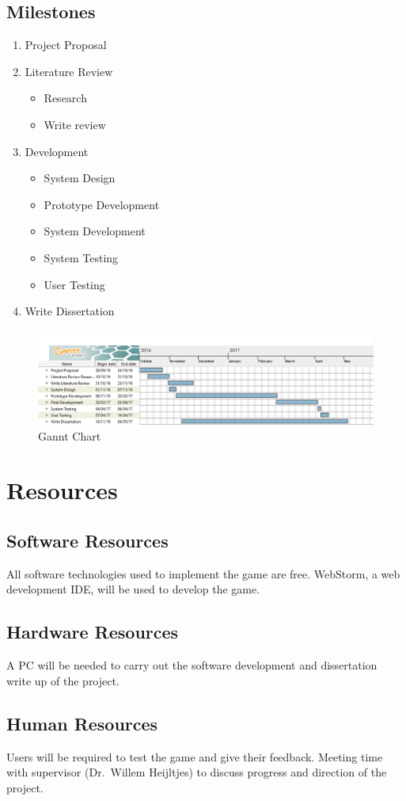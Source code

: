 \documentclass[12pt,a4paper]{report}
\begin{document}
\section{Milestones}
\begin{enumerate}
  \item Project Proposal
  \item Literature Review
  \begin{itemize}
  \item Research
  \item Write review
  \end{itemize}
  \item Development
  \begin{itemize}
  \item System Design
  \item Prototype Development
  \item System Development
  \item System Testing
  \item User Testing
  \end{itemize}
  \item Write Dissertation
\end{enumerate}

\begin{figure}[h]
\caption{Gannt Chart}
\centering
\label{fig:ganntchart}
\includegraphics[width=\textwidth,height=\textheight,keepaspectratio]{Gantt}
\end{figure}

{\let\clearpage\relax\chapter{Resources}}
\section{Software Resources}
All software technologies used to implement the game are free. WebStorm, a web development IDE, will be used to develop the game.

\section{Hardware Resources}
A PC will be needed to carry out the software development and dissertation write up of the project. 

\section{Human Resources}
Users will be required to test the game and give their feedback. 
Meeting time with supervisor (Dr.~Willem Heijltjes) to discuss progress and direction of the project.


 
\end{document}
